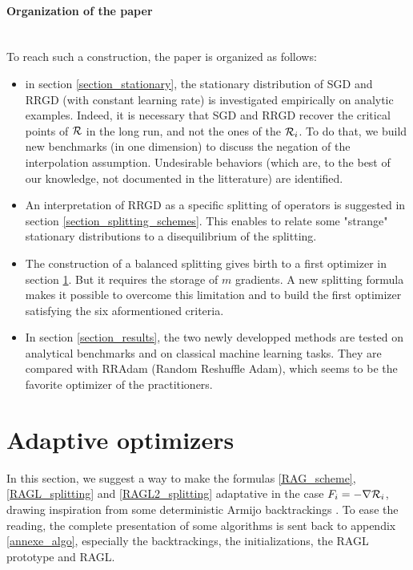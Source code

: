 \paragraph{Organization of the paper}
~~\\
To reach such a construction, the paper is organized as follows:
\begin{itemize}
	\item in section \ref{section_stationary}, the stationary distribution of SGD and RRGD (with constant learning rate) is investigated empirically on analytic examples.
          Indeed, it is necessary that SGD and RRGD recover the critical points of $\mathcal{R}$ in the long run, and not the ones of the $\mathcal{R}_i$. To do that, we build new benchmarks (in one
          dimension) to discuss the negation of the interpolation assumption. Undesirable behaviors (which are, to the best of our knowledge, not documented in the litterature) are identified. 
	\item An interpretation of RRGD as a specific splitting of operators is suggested in section \ref{section_splitting_schemes}. This enables to relate some "strange" stationary distributions to a disequilibrium of the splitting. 
	\item The construction of a balanced splitting gives birth to a first optimizer in section \ref{section_optimizers}. But it requires the storage of $m$ gradients. A new
          splitting formula makes it possible to overcome this limitation and to build the first optimizer satisfying the six aformentioned criteria.
	\item In section \ref{section_results}, the two newly developped methods are tested on analytical benchmarks and on classical machine learning tasks. They are compared with
          RRAdam (Random Reshuffle Adam), which seems to be the favorite optimizer of the practitioners.   
\end{itemize}

\section{Adaptive optimizers}
\label{section_optimizers}

In this section, we suggest a way to make the formulas \eqref{RAG_scheme}, \eqref{RAGL_splitting} and \eqref{RAGL2_splitting} adaptative in the case $F_i=-\nabla \mathcal{R}_i$, drawing inspiration from some deterministic Armijo backtrackings \cite{armijo,Rondepierre,Lyap_Theory_Bilel,Bilel_thesis}. To ease the reading, the complete presentation of some algorithms is sent back to appendix \ref{annexe_algo}, especially the backtrackings, the initializations, the RAGL prototype and RAGL.

